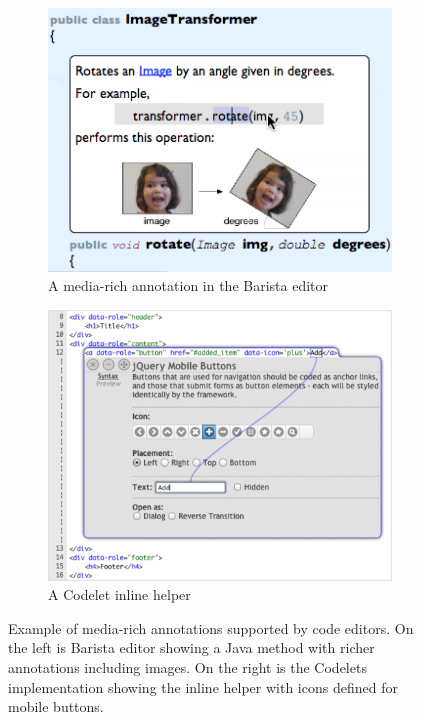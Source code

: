 \begin{figure}[h]
\centering
\begin{subfigure}{.5\textwidth}
  \centering
  \includegraphics[width=.7\linewidth]{images/barista}
  \caption{A media-rich annotation in the Barista editor}
  \label{fig:barista}
\end{subfigure}%
\begin{subfigure}{.5\textwidth}
  \centering
  \includegraphics[width=.7\linewidth]{images/codelet}
  \caption{A Codelet inline helper}
  \label{fig:codelet}
\end{subfigure}
\caption{Example of media-rich annotations supported by code editors. On the left is Barista editor showing a Java method with richer annotations including images. On the right is the Codelets implementation showing the inline helper with icons defined for mobile buttons.}
\label{fig:richmedia}
\end{figure}


